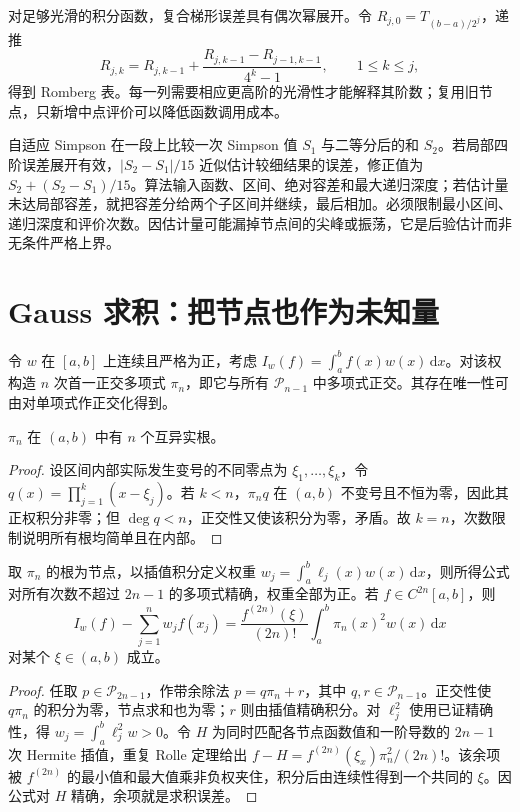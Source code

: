 对足够光滑的积分函数，复合梯形误差具有偶次幂展开。令 $R_{j,0}=T_{(b-a)/2^j}$，递推
\[
 R_{j,k}=R_{j,k-1}+\frac{R_{j,k-1}-R_{j-1,k-1}}{4^k-1},\qquad1\le k\le j,
\]
得到 Romberg 表。每一列需要相应更高阶的光滑性才能解释其阶数；复用旧节点，只新增中点评价可以降低函数调用成本。

自适应 Simpson 在一段上比较一次 Simpson 值 $S_1$ 与二等分后的和 $S_2$。若局部四阶误差展开有效，$|S_2-S_1|/15$ 近似估计较细结果的误差，修正值为 $S_2+(S_2-S_1)/15$。算法输入函数、区间、绝对容差和最大递归深度；若估计量未达局部容差，就把容差分给两个子区间并继续，最后相加。必须限制最小区间、递归深度和评价次数。因估计量可能漏掉节点间的尖峰或振荡，它是后验估计而非无条件严格上界。

\section{Gauss 求积：把节点也作为未知量}
令 $w$ 在 $[a,b]$ 上连续且严格为正，考虑 $I_w(f)=\int_a^bf(x)w(x)\,\mathrm dx$。对该权构造 $n$ 次首一正交多项式 $\pi_n$，即它与所有 $\mathcal P_{n-1}$ 中多项式正交。其存在唯一性可由对单项式作正交化得到。

\begin{lemma}[正交多项式的零点]
$\pi_n$ 在 $(a,b)$ 中有 $n$ 个互异实根。
\end{lemma}
\begin{proof}
设区间内部实际发生变号的不同零点为 $\xi_1,\ldots,\xi_k$，令 $q(x)=\prod_{j=1}^k(x-\xi_j)$。若 $k<n$，$\pi_nq$ 在 $(a,b)$ 不变号且不恒为零，因此其正权积分非零；但 $\deg q<n$，正交性又使该积分为零，矛盾。故 $k=n$，次数限制说明所有根均简单且在内部。
\end{proof}

\begin{theorem}
\label{thm:na-gauss}
取 $\pi_n$ 的根为节点，以插值积分定义权重 $w_j=\int_a^b\ell_j(x)w(x)\,\mathrm dx$，则所得公式对所有次数不超过 $2n-1$ 的多项式精确，权重全部为正。若 $f\in C^{2n}[a,b]$，则
\[
 I_w(f)-\sum_{j=1}^nw_jf(x_j)
 =\frac{f^{(2n)}(\xi)}{(2n)!}\int_a^b\pi_n(x)^2w(x)\,\mathrm dx
\]
对某个 $\xi\in(a,b)$ 成立。
\end{theorem}
\begin{proof}
任取 $p\in\mathcal P_{2n-1}$，作带余除法 $p=q\pi_n+r$，其中 $q,r\in\mathcal P_{n-1}$。正交性使 $q\pi_n$ 的积分为零，节点求和也为零；$r$ 则由插值精确积分。对 $\ell_j^2$ 使用已证精确性，得 $w_j=\int_a^b\ell_j^2w>0$。令 $H$ 为同时匹配各节点函数值和一阶导数的 $2n-1$ 次 Hermite 插值，重复 Rolle 定理给出 $f-H=f^{(2n)}(\xi_x)\pi_n^2/(2n)!$。该余项被 $f^{(2n)}$ 的最小值和最大值乘非负权夹住，积分后由连续性得到一个共同的 $\xi$。因公式对 $H$ 精确，余项就是求积误差。
\end{proof}

